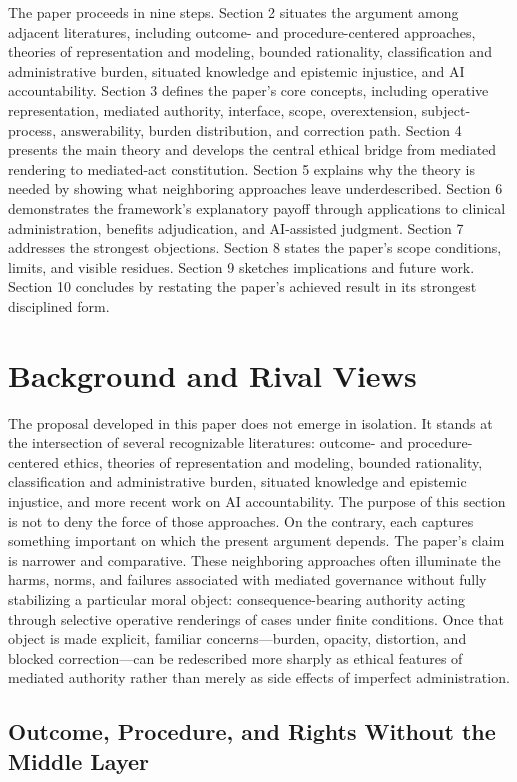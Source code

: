 \documentclass[11pt]{article}
\begin{document}
The paper proceeds in nine steps. Section 2 situates the argument among adjacent literatures, including outcome- and procedure-centered approaches, theories of representation and modeling, bounded rationality, classification and administrative burden, situated knowledge and epistemic injustice, and AI accountability. Section 3 defines the paper's core concepts, including operative representation, mediated authority, interface, scope, overextension, subject-process, answerability, burden distribution, and correction path. Section 4 presents the main theory and develops the central ethical bridge from mediated rendering to mediated-act constitution. Section 5 explains why the theory is needed by showing what neighboring approaches leave underdescribed. Section 6 demonstrates the framework's explanatory payoff through applications to clinical administration, benefits adjudication, and AI-assisted judgment. Section 7 addresses the strongest objections. Section 8 states the paper's scope conditions, limits, and visible residues. Section 9 sketches implications and future work. Section 10 concludes by restating the paper's achieved result in its strongest disciplined form.
\section{Background and Rival Views}

The proposal developed in this paper does not emerge in isolation. It stands at the intersection of several recognizable literatures: outcome- and procedure-centered ethics, theories of representation and modeling, bounded rationality, classification and administrative burden, situated knowledge and epistemic injustice, and more recent work on AI accountability. The purpose of this section is not to deny the force of those approaches. On the contrary, each captures something important on which the present argument depends. The paper's claim is narrower and comparative. These neighboring approaches often illuminate the harms, norms, and failures associated with mediated governance without fully stabilizing a particular moral object: consequence-bearing authority acting through selective operative renderings of cases under finite conditions. Once that object is made explicit, familiar concerns---burden, opacity, distortion, and blocked correction---can be redescribed more sharply as ethical features of mediated authority rather than merely as side effects of imperfect administration.

\subsection{Outcome, Procedure, and Rights Without the Middle Layer}
\end{document}
